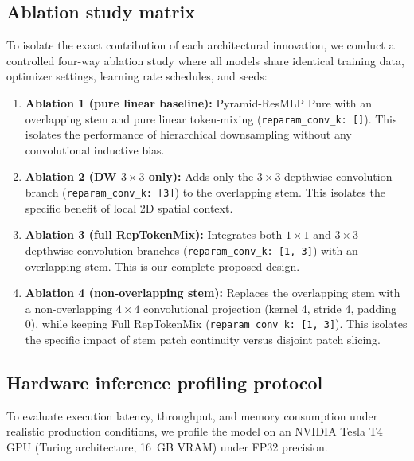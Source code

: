 \subsection{Ablation study matrix}
\label{subsection:ablation_matrix}
To isolate the exact contribution of each architectural innovation, we conduct a controlled four-way ablation study where all models share identical training data, optimizer settings, learning rate schedules, and seeds:
\begin{enumerate}
    \item \textbf{Ablation 1 (pure linear baseline):} Pyramid-ResMLP Pure with an overlapping stem and pure linear token-mixing (\texttt{reparam\_conv\_k: []}). This isolates the performance of hierarchical downsampling without any convolutional inductive bias.
    \item \textbf{Ablation 2 (DW $3 \times 3$ only):} Adds only the $3 \times 3$ depthwise convolution branch (\texttt{reparam\_conv\_k: [3]}) to the overlapping stem. This isolates the specific benefit of local 2D spatial context.
    \item \textbf{Ablation 3 (full RepTokenMix):} Integrates both $1 \times 1$ and $3 \times 3$ depthwise convolution branches (\texttt{reparam\_conv\_k: [1, 3]}) with an overlapping stem. This is our complete proposed design.
    \item \textbf{Ablation 4 (non-overlapping stem):} Replaces the overlapping stem with a non-overlapping $4 \times 4$ convolutional projection (kernel 4, stride 4, padding 0), while keeping Full RepTokenMix (\texttt{reparam\_conv\_k: [1, 3]}). This isolates the specific impact of stem patch continuity versus disjoint patch slicing.
\end{enumerate}

\subsection{Hardware inference profiling protocol}
\label{subsection:profiling_protocol}
To evaluate execution latency, throughput, and memory consumption under realistic production conditions, we profile the model on an NVIDIA Tesla T4 GPU (Turing architecture, 16~GB VRAM) under FP32 precision.

